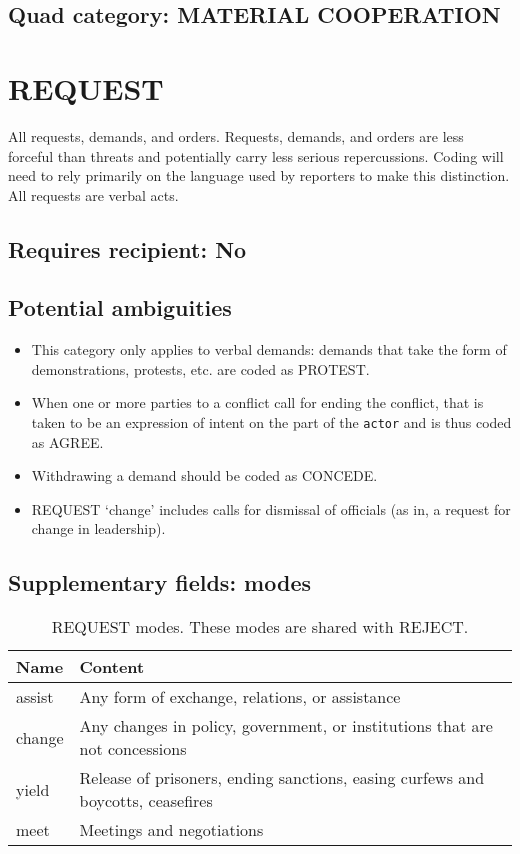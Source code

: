\documentclass[11pt]{report}
\newcommand{\plcat}[1]{\textsf{#1}}
\newcommand{\txt}[1]{\texttt{#1}}
\begin{document}
\subsection{Quad category: MATERIAL COOPERATION}



\newpage

\section{REQUEST}

All requests, demands, and orders. Requests, demands, and orders are less forceful than threats and potentially carry less serious repercussions. Coding will need to rely primarily on the language used by reporters to make this distinction. All requests are verbal acts.

\subsection{Requires recipient: No}


\subsection{Potential ambiguities}

\begin{itemize}
\item This category only applies to verbal demands: demands that take the form of demonstrations, protests, etc. are coded as \plcat{PROTEST}.
\item When one or more parties to a conflict call for ending the conflict, that is taken to be an expression of intent on the part of the \txt{actor} and is thus coded as \plcat{AGREE}.
\item Withdrawing a demand should be coded as \plcat{CONCEDE}.
\item \plcat{REQUEST} `change' includes calls for dismissal of officials (as in, a request for change in leadership).
\end{itemize}


\subsection{Supplementary fields: modes}


\begin{table}[htp]
\caption{REQUEST modes. These modes are shared with REJECT.}
\begin{center}
\begin{tabular}{|l|p{13cm}|}
\hline
Name & Content \\
\hline
assist & Any form of exchange, relations, or assistance\\
change & Any changes in policy, government, or institutions that are not concessions \\
yield & Release of prisoners, ending sanctions, easing curfews and boycotts, ceasefires\\
meet & Meetings and negotiations\\
\hline
\end{tabular}
\end{center}
\label{tab:requestmode2}
\end{table}%
\end{document}

